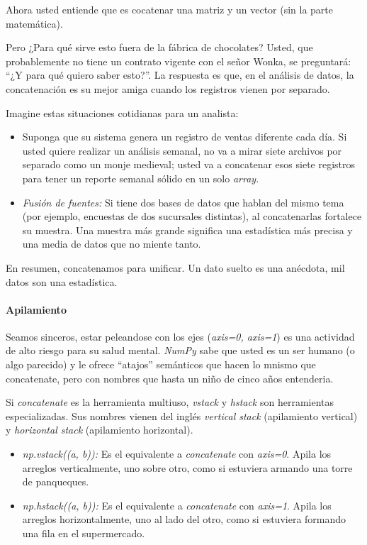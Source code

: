 Ahora usted entiende que es cocatenar una matriz y un vector (sin la parte matemática). 

Pero ¿Para qué sirve esto fuera de la fábrica de chocolates? Usted, que probablemente no tiene un contrato vigente con el señor Wonka, se preguntará: ``¿Y para qué quiero saber esto?''. La respuesta es que, en el análisis de datos, la concatenación es su mejor amiga cuando los registros vienen por separado.

Imagine estas situaciones cotidianas para un analista: 
\begin{itemize}
    \item Suponga que su sistema genera un registro de ventas diferente cada día. Si usted quiere realizar un análisis semanal, no va a mirar siete archivos por separado como un monje medieval; usted va a concatenar esos siete registros para tener un reporte semanal sólido en un solo \textit{array}.
    \item \textit{Fusión de fuentes:} Si tiene dos bases de datos que hablan del mismo tema (por ejemplo, encuestas de dos sucursales distintas), al concatenarlas fortalece su muestra. Una muestra más grande significa una estadística más precisa y una media de datos que no miente tanto.
\end{itemize}

En resumen, concatenamos para unificar. Un dato suelto es una anécdota, mil datos son una estadística.


\paragraph{Apilamiento}

Seamos sinceros, estar peleandose con los ejes (\textit{axis=0, axis=1}) es una actividad de alto riesgo para su salud mental. \textit{NumPy} sabe que usted es un ser humano (o algo parecido) y le ofrece ``atajos'' semánticos que hacen lo mnismo que concatenate, pero con nombres que hasta un niño de cinco años entenderia.

Si \textit{concatenate} es la herramienta multiuso, \textit{vstack} y \textit{hstack} son herramientas especializadas. Sus nombres vienen del inglés \textit{vertical stack} (apilamiento vertical) y \textit{horizontal stack} (apilamiento horizontal).

\begin{itemize}
\item \textit{np.vstack((a, b)):} Es el equivalente a \textit{concatenate} con \textit{axis=0}. Apila los arreglos verticalmente, uno sobre otro, como si estuviera armando una torre de panqueques.
\item \textit{np.hstack((a, b)):} Es el equivalente a \textit{concatenate} con \textit{axis=1}. Apila los arreglos horizontalmente, uno al lado del otro, como si estuviera formando una fila en el supermercado.
\end{itemize}

